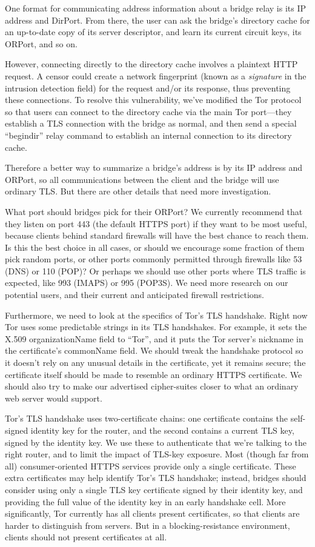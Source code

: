 \documentclass{llncs}
\begin{document}
One format for communicating address information about a bridge relay is
its IP address and DirPort. From there, the user can ask the bridge's
directory cache for an up-to-date copy of its server descriptor, and
learn its current circuit keys, its ORPort, and so on.

However, connecting directly to the directory cache involves a plaintext
HTTP request. A censor could create a network fingerprint (known as a
\emph{signature} in the intrusion detection field) for the request
and/or its response, thus preventing these connections. To resolve this
vulnerability, we've modified the Tor protocol so that users can connect
to the directory cache via the main Tor port---they establish a TLS
connection with the bridge as normal, and then send a special ``begindir''
relay command to establish an internal connection to its directory cache.

Therefore a better way to summarize a bridge's address is by its IP
address and ORPort, so all communications between the client and the
bridge will use ordinary TLS. But there are other details that need
more investigation.

What port should bridges pick for their ORPort? We currently recommend
that they listen on port 443 (the default HTTPS port) if they want to
be most useful, because clients behind standard firewalls will have
the best chance to reach them. Is this the best choice in all cases,
or should we encourage some fraction of them pick random ports, or other
ports commonly permitted through firewalls like 53 (DNS) or 110
(POP)?  Or perhaps we should use other ports where TLS traffic is
expected, like 993 (IMAPS) or 995 (POP3S).  We need more research on our
potential users, and their current and anticipated firewall restrictions.

Furthermore, we need to look at the specifics of Tor's TLS handshake.
Right now Tor uses some predictable strings in its TLS handshakes. For
example, it sets the X.509 organizationName field to ``Tor'', and it puts
the Tor server's nickname in the certificate's commonName field. We
should tweak the handshake protocol so it doesn't rely on any unusual details
in the certificate, yet it remains secure; the certificate itself
should be made to resemble an ordinary HTTPS certificate.  We should also try
to make our advertised cipher-suites closer to what an ordinary web server
would support.

Tor's TLS handshake uses two-certificate chains: one certificate
contains the self-signed identity key for
the router, and the second contains a current TLS key, signed by the
identity key. We use these to authenticate that we're talking to the right
router, and to limit the impact of TLS-key exposure.  Most (though far from
all) consumer-oriented HTTPS services provide only a single certificate.
These extra certificates may help identify Tor's TLS handshake; instead,
bridges should consider using only a single TLS key certificate signed by
their identity key, and providing the full value of the identity key in an
early handshake cell.  More significantly, Tor currently has all clients
present certificates, so that clients are harder to distinguish from servers.
But in a blocking-resistance environment, clients should not present
certificates at all.
\end{document}
